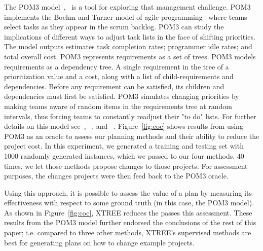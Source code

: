 \documentclass{sig-alternate}
\newcommand{\fig}[1]{Figure~\ref{fig:#1}}
\begin{document}

The POM3 model~\cite{boehm2003using},~\cite{port2008} is a tool for exploring that management challenge. POM3 implements the Boehm and Turner model of agile programming~\cite{boehm2003balancing} where teams select tasks as they appear in the scrum backlog.  POM3 can study the implications of different ways to adjust task lists in the face of shifting priorities. The model outputs estimates task completion rates; programmer idle rates; and total overall cost. POM3 represents requirements as a set of trees. POM3 models requirements as a dependency tree. A single requirement in the tree of a prioritization value and a cost, along with a list of child-requirements and dependencies. Before any requirement can be satisfied, its children and dependencies must first be satisfied. POM3 simulates changing priorities by making teams aware of random items in the requirements tree at random intervals, thus forcing teams to constantly readjust their "to do" lists. For further details on this model see~\cite{boehm2003balancing}, ~\cite{boehm2003using}, and ~\cite{port2008}. \fig{coc} shows results from using POM3 as an oracle to assess our planning methods and their ability to reduce the project cost. In this experiment, we generated a training and testing set with 1000 randomly generated instances, which we passed to our four methods.
40 times, we let those methods propose changes to those projects. 
For assessment purposes, the changes projects were then feed back to the POM3
oracle. 

Using this approach, it is possible to assess the value of a plan by measuring its
effectiveness with respect to some ground truth (in this case, the POM3 model).
As shown in \fig{coc}, XTREE reduces the  passes this assessment. These results from the POM3 model further endorsed the conclusions of the rest
of this paper; i.e. compared to three other methods,  XTREE's supervised methods are best for generating plans on how to change example projects.
\end{document}
